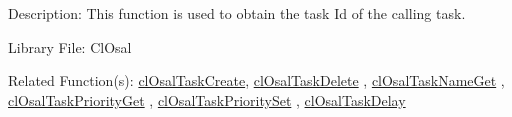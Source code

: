 \begin{Desc}
\item[Description:]This function is used to obtain the task Id of the calling task.\end{Desc}
\begin{Desc}
\item[Library File:]Cl\-Osal\end{Desc}
\begin{Desc}
\item[Related Function(s):]\hyperlink{pageosal103}{cl\-Osal\-Task\-Create}, \hyperlink{pageosal104}{cl\-Osal\-Task\-Delete} , 
\hyperlink{pageosal106}{cl\-Osal\-Task\-Name\-Get} , \hyperlink{pageosal107}{cl\-Osal\-Task\-Priority\-Get} , 
\hyperlink{pageosal108}{cl\-Osal\-Task\-Priority\-Set} , \hyperlink{pageosal109}{cl\-Osal\-Task\-Delay} \end{Desc}

\newpage
